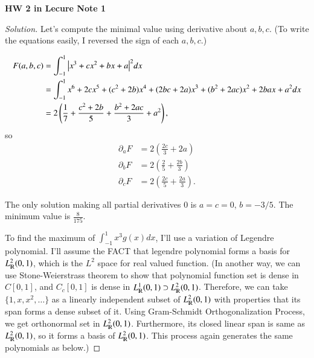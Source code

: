 \documentclass[a4paper, 12pt]{article}
\theoremstyle{Mydefinition}
\theoremstyle{Mytheorem}
\begin{document}
\noindent \textbf{HW 2 in Lecure Note 1}

\begin{proof}[Solution]
Let's compute the minimal value using derivative about $a,b,c$. (To write the equations easily, I reversed the sign of each $a,b,c$.)

\begin{equation}
\begin{split}
    F(a,b,c) &= \int_{-1}^1 \abs{x^3+cx^2+bx+a}^2 dx \\
    &=  \int_{-1}^1 x^6+2cx^5+(c^2+2b)x^4+(2bc+2a)x^3+(b^2+2ac)x^2+2bax+a^2 dx \\
    &=2\left(\frac{1}{7}+\frac{c^2+2b}{5} + \frac{b^2+2ac}{3} + a^2 \right),
\end{split}
\end{equation}
so
\begin{equation}
\begin{split}
    \partial_a F &= 2\left(\frac{2c}{3} + 2a\right) \\
    \partial_b F &= 2\left(\frac{2}{5} + \frac{2b}{3}\right) \\
    \partial_c F &= 2\left(\frac{2c}{5} + \frac{2a}{3}\right).
\end{split}
\end{equation}

The only solution making all partial derivatives $0$ is $a=c=0$, $b=-3/5$. The minimum value is $\frac{8}{175}$.

To find the maximum of $\int_{-1}^1 x^3 g(x) dx$, I'll use a variation of Legendre polynomial. I'll assume the FACT that legendre polynomial forms a basis for $L_{\varmathbb{R}}^2(0,1)$, which is the $L^2$ space for real valued function. (In another way, we can use Stone-Weierstrass theorem to show that polynomial function set is dense in $C[0,1]$, and $C_c[0,1]$ is dense in $L_{\varmathbb{R}}^1(0,1)\supset L_{\varmathbb{R}}^2(0,1)$. Therefore, we can take $\{1,x, x^2, \ldots\}$ as a linearly independent subset of $L_{\varmathbb{R}}^2(0,1)$ with properties that its span forms a dense subset of it. Using Gram-Schmidt Orthogonalization Process, we get orthonormal set in $L_{\varmathbb{R}}^2(0,1)$. Furthermore, its closed linear span is same as $L_{\varmathbb{R}}^2(0,1)$, so it forms a basis of $L_{\varmathbb{R}}^2(0,1)$. This process again generates the same polynomials as below.)


\end{proof}
\end{document}
